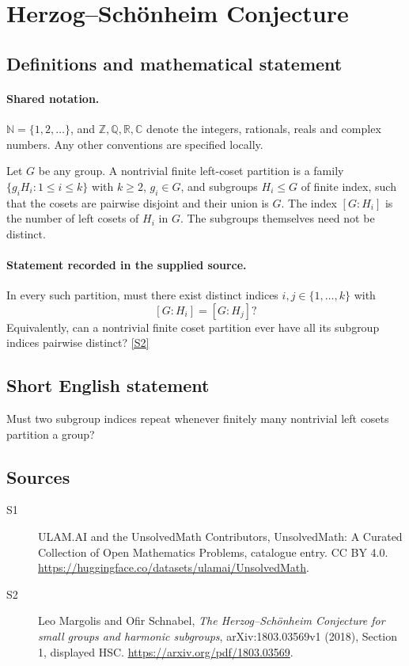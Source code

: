 \documentclass[11pt]{article}
\newcommand{\sref}[2]{\hyperlink{source:#1:#2}{[S#2]}}
\begin{document}
\section{Herzog–Schönheim Conjecture}\label{statement}

\subsection{Definitions and mathematical statement}

\paragraph{Shared notation.}$\mathbb N=\{1,2,\ldots\}$, and $\mathbb Z,\mathbb Q,\mathbb R,\mathbb C$ denote the integers, rationals, reals and complex numbers. Any other conventions are specified locally.


Let $G$ be any group. A nontrivial finite left-coset partition is a family $\{g_iH_i:1\leq i\leq k\}$ with $k\geq2$, $g_i\in G$, and subgroups $H_i\leq G$ of finite index, such that the cosets are pairwise disjoint and their union is $G$. The index $[G:H_i]$ is the number of left cosets of $H_i$ in $G$. The subgroups themselves need not be distinct.
\paragraph{Statement recorded in the supplied source.}
In every such partition, must there exist distinct indices $i,j\in\{1,\ldots,k\}$ with
\[
[G:H_i]=[G:H_j]?
\]
Equivalently, can a nontrivial finite coset partition ever have all its subgroup indices pairwise distinct? \sref{statement}{2}

\subsection{Short English statement}
Must two subgroup indices repeat whenever finitely many nontrivial left cosets partition a group?
\subsection{Sources}
\begin{description}
\item[\hypertarget{source:statement:1}{S1}] ULAM.AI and the UnsolvedMath Contributors, UnsolvedMath: A Curated Collection of Open Mathematics Problems, catalogue entry. CC BY 4.0. \url{https://huggingface.co/datasets/ulamai/UnsolvedMath}.
\item[\hypertarget{source:statement:2}{S2}] Leo Margolis and Ofir Schnabel, \emph{The Herzog--Sch\"onheim Conjecture for small groups and harmonic subgroups}, arXiv:1803.03569v1 (2018), Section 1, displayed HSC. \url{https://arxiv.org/pdf/1803.03569}.
\end{description}
\label{end:statement}
\end{document}
